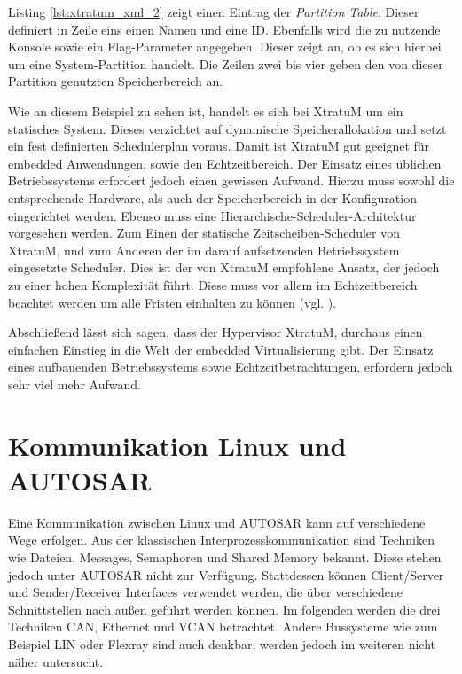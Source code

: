 \documentclass[
  a4paper,					    %
  twoside,
  DIV=calc,     				%
  bibliography=totoc,
  cleardoublepage=empty,
  ngerman,     					%
  final       					%
]{scrbook}
\begin{document}
Listing \ref{lst:xtratum_xml_2} zeigt einen Eintrag der \emph{Partition Table}. Dieser definiert in Zeile eins einen Namen und eine ID. Ebenfalls wird die zu nutzende Konsole sowie ein Flag-Parameter angegeben. Dieser zeigt an, ob es sich hierbei um eine System-Partition handelt. Die Zeilen zwei bis vier geben den von dieser Partition genutzten Speicherbereich an.

Wie an diesem Beispiel zu sehen ist, handelt es sich bei XtratuM um ein statisches System. Dieses verzichtet auf dynamische Speicherallokation und setzt ein fest definierten Schedulerplan voraus. Damit ist XtratuM gut geeignet für embedded Anwendungen, sowie den Echtzeitbereich. Der Einsatz eines üblichen Betriebssystems erfordert jedoch einen gewissen Aufwand. Hierzu muss sowohl die entsprechende Hardware, als auch der Speicherbereich in der Konfiguration eingerichtet werden. Ebenso muss eine Hierarchische-Scheduler-Architektur vorgesehen werden. Zum Einen der statische Zeitscheiben-Scheduler von XtratuM, und zum Anderen der im darauf aufsetzenden Betriebssystem eingesetzte Scheduler. Dies ist der von XtratuM empfohlene Ansatz, der jedoch zu einer hohen Komplexität führt. Diese muss vor allem im Echtzeitbereich beachtet werden um alle Fristen einhalten zu können (vgl. \cite{two_lvl_sched}).

Abschließend lässt sich sagen, dass der Hypervisor XtratuM, durchaus einen einfachen Einstieg in die Welt der embedded Virtualisierung gibt. Der Einsatz eines aufbauenden Betriebssystems sowie Echtzeitbetrachtungen, erfordern jedoch sehr viel mehr Aufwand.






\section{Kommunikation Linux und AUTOSAR}
\label{sec:Kommunikation_L_A}
Eine Kommunikation zwischen Linux und AUTOSAR kann auf verschiedene Wege erfolgen. Aus der klassischen Interprozesskommunikation sind Techniken wie Dateien, Messages, Semaphoren und Shared Memory bekannt. Diese stehen jedoch unter AUTOSAR nicht zur Verfügung. Stattdessen können Client/Server und Sender/Receiver Interfaces verwendet werden, die über verschiedene Schnittstellen nach außen geführt werden können. Im folgenden werden die drei Techniken CAN, Ethernet und VCAN betrachtet. Andere Bussysteme wie zum Beispiel LIN oder Flexray sind auch denkbar, werden jedoch im weiteren nicht näher untersucht.
\end{document}
